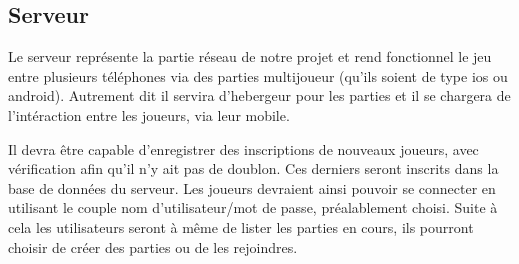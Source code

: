 \subsection{Serveur}
	
	Le serveur représente la partie réseau de notre projet et rend fonctionnel le jeu entre plusieurs téléphones via des parties multijoueur (qu'ils soient de type
	\gls{ios} ou \gls{android}). Autrement dit il servira d'hebergeur pour les parties et
	il se chargera de l'intéraction entre les joueurs, via leur mobile.
	
	Il devra être capable d'enregistrer des inscriptions de nouveaux joueurs, avec
	vérification afin qu'il n'y ait pas de doublon. Ces derniers seront inscrits dans 
	la base de données du serveur. Les joueurs devraient ainsi
	pouvoir se connecter en utilisant le couple nom d'utilisateur/mot de passe,
	préalablement choisi. Suite à cela les utilisateurs seront à même de lister
	les parties en cours, ils pourront choisir de créer des parties ou de les rejoindres.